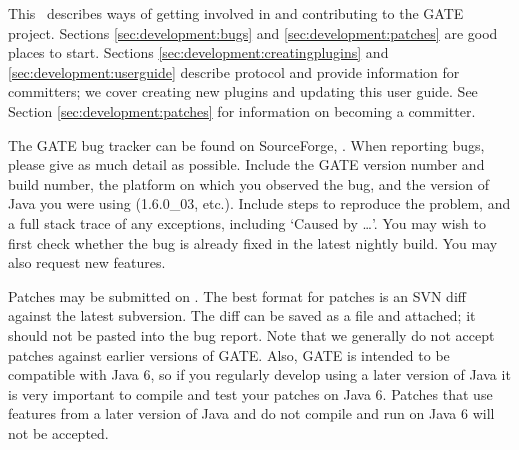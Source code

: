 \nnormalsize


This \chapthing\ describes ways of getting involved in and contributing to the
GATE project. Sections \ref{sec:development:bugs} and
\ref{sec:development:patches} are good places to start. Sections
\ref{sec:development:creatingplugins} and \ref{sec:development:userguide}
describe protocol and provide information for committers; we cover creating new
plugins and updating this user guide. See Section \ref{sec:development:patches}
for information on becoming a committer.



The GATE bug tracker can be found on
SourceForge, . When
reporting bugs, please give as much detail as possible. Include the GATE
version number and build number, the platform on which you observed the bug,
and the version of Java you were using (1.6.0\_03, etc.). Include
steps to reproduce the problem, and a full stack trace of any exceptions,
including `Caused by \ldots'. You may wish to first check whether the bug is
already fixed in the latest nightly build. You may also request new features.


Patches may be submitted on
. The best
format for patches is an SVN diff against the latest subversion. The diff can be
saved as a file and attached; it should not be pasted into the bug report. Note
that we generally do not accept patches against earlier versions of GATE. Also,
GATE is intended to be compatible with Java 6, so if you regularly develop
using a later version of Java it is very important to compile and test your
patches on Java 6.  Patches that use features from a later version of Java and
do not compile and run on Java 6 will not be accepted.

